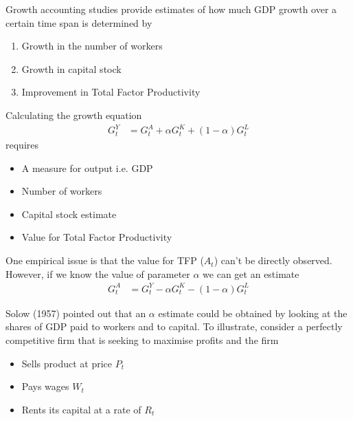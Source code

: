 \documentclass{beamer}
\begin{document}
\begin{frame}
  Growth accounting studies provide estimates of how much GDP growth over a certain time span is determined by 
  \begin{enumerate}
    \item Growth in the number of workers
    \item Growth in capital stock
    \item Improvement in Total Factor Productivity
  \end{enumerate}
\end{frame}

\begin{frame}
Calculating the growth equation
\begin{align}
  G_t ^Y &=G_t^A +\alpha G_t^K + (1-\alpha)G_t^L
\end{align}
\medskip
requires
\begin{itemize}
  \item A measure for output i.e. GDP
  \item Number of workers
  \item Capital stock estimate 
  \item Value for Total Factor Productivity
\end{itemize}
\end{frame}

\begin{frame}
One empirical issue is that the value for TFP ($A_t$) can't be directly observed. 
However, if we know the value of parameter $\alpha$ we can get an estimate
\begin{align}
  G_t ^A &=G_t^Y -\alpha G_t^K - (1-\alpha)G_t^L
\end{align}
\end{frame}

\begin{frame}
  Solow (1957) pointed out that an $\alpha$ estimate could be obtained by looking at the shares of GDP paid to workers and to capital. 
  To illustrate, consider a perfectly competitive firm that is seeking to maximise profits and the firm
  \begin{itemize}
    \item Sells product at price $P_t$
    \item Pays wages $W_t$
    \item Rents its capital at a rate of $R_t$
  \end{itemize}
\end{frame}
\end{document}
